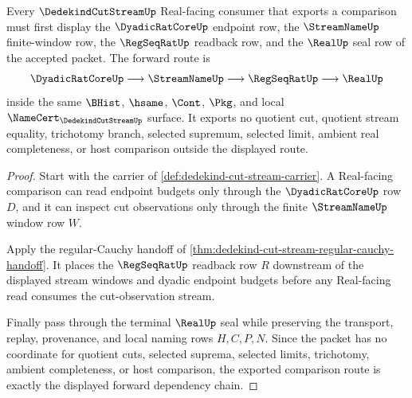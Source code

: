 \begin{theorem}
\label{thm:dedekind-cut-stream-regseqrat-forward-route}
Every $\DedekindCutStreamUp$ Real-facing consumer that exports a comparison must first display the $\DyadicRatCoreUp$ endpoint row, the $\StreamNameUp$ finite-window row, the $\RegSeqRatUp$ readback row, and the $\RealUp$ seal row of the accepted packet. The forward route is
$$
\DyadicRatCoreUp
\longrightarrow
\StreamNameUp
\longrightarrow
\RegSeqRatUp
\longrightarrow
\RealUp
$$
inside the same $\BHist$, $\hsame$, $\Cont$, $\Pkg$, and local $\NameCert_{\DedekindCutStreamUp}$ surface. It exports no quotient cut, quotient stream equality, trichotomy branch, selected supremum, selected limit, ambient real completeness, or host comparison outside the displayed route.
\end{theorem}
\begin{proof}
Start with the carrier of \autoref{def:dedekind-cut-stream-carrier}. A Real-facing comparison can read endpoint budgets only through the $\DyadicRatCoreUp$ row $D$, and it can inspect cut observations only through the finite $\StreamNameUp$ window row $W$.

Apply the regular-Cauchy handoff of \autoref{thm:dedekind-cut-stream-regular-cauchy-handoff}. It places the $\RegSeqRatUp$ readback row $R$ downstream of the displayed stream windows and dyadic endpoint budgets before any Real-facing read consumes the cut-observation stream.

Finally pass through the terminal $\RealUp$ seal while preserving the transport, replay, provenance, and local naming rows $H,C,P,N$. Since the packet has no coordinate for quotient cuts, selected suprema, selected limits, trichotomy, ambient completeness, or host comparison, the exported comparison route is exactly the displayed forward dependency chain.
\end{proof}
